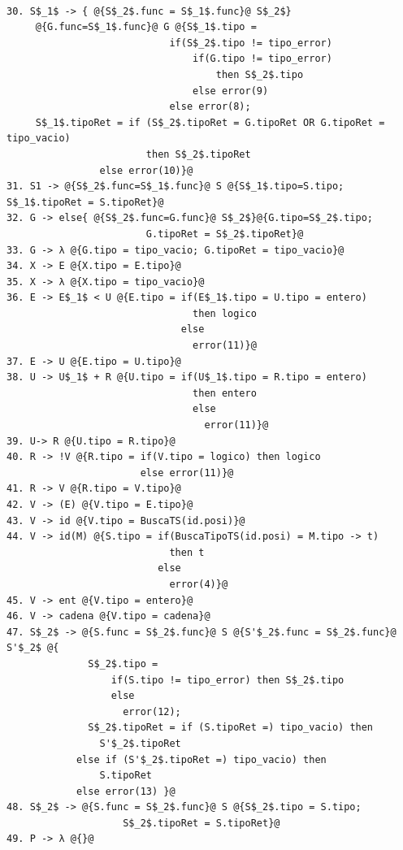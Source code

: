 \begin{lstlisting}[style=EdT]
                     
30. S$_1$ -> { @{S$_2$.func = S$_1$.func}@ S$_2$}
     @{G.func=S$_1$.func}@ G @{S$_1$.tipo =
                            if(S$_2$.tipo != tipo_error)
                                if(G.tipo != tipo_error)
                                    then S$_2$.tipo
                                else error(9)
                            else error(8);
     S$_1$.tipoRet = if (S$_2$.tipoRet = G.tipoRet OR G.tipoRet = tipo_vacio)
						then S$_2$.tipoRet
				else error(10)}@
31. S1 -> @{S$_2$.func=S$_1$.func}@ S @{S$_1$.tipo=S.tipo; S$_1$.tipoRet = S.tipoRet}@
32. G -> else{ @{S$_2$.func=G.func}@ S$_2$}@{G.tipo=S$_2$.tipo; 
						G.tipoRet = S$_2$.tipoRet}@
33. G -> λ @{G.tipo = tipo_vacio; G.tipoRet = tipo_vacio}@
34. X -> E @{X.tipo = E.tipo}@
35. X -> λ @{X.tipo = tipo_vacio}@
36. E -> E$_1$ < U @{E.tipo = if(E$_1$.tipo = U.tipo = entero)
                                then logico
                              else
                                error(11)}@
37. E -> U @{E.tipo = U.tipo}@
38. U -> U$_1$ + R @{U.tipo = if(U$_1$.tipo = R.tipo = entero)
                                then entero
                                else
                                  error(11)}@
39. U-> R @{U.tipo = R.tipo}@
40. R -> !V @{R.tipo = if(V.tipo = logico) then logico
                       else error(11)}@
41. R -> V @{R.tipo = V.tipo}@
42. V -> (E) @{V.tipo = E.tipo}@
43. V -> id @{V.tipo = BuscaTS(id.posi)}@
44. V -> id(M) @{S.tipo = if(BuscaTipoTS(id.posi) = M.tipo -> t)
                            then t
                          else
                            error(4)}@
45. V -> ent @{V.tipo = entero}@
46. V -> cadena @{V.tipo = cadena}@
47. S$_2$ -> @{S.func = S$_2$.func}@ S @{S'$_2$.func = S$_2$.func}@ S'$_2$ @{
              S$_2$.tipo =
                  if(S.tipo != tipo_error) then S$_2$.tipo
                  else
                    error(12);
              S$_2$.tipoRet = if (S.tipoRet =) tipo_vacio) then 
				S'$_2$.tipoRet
			else if (S'$_2$.tipoRet =) tipo_vacio) then
				S.tipoRet
			else error(13) }@
48. S$_2$ -> @{S.func = S$_2$.func}@ S @{S$_2$.tipo = S.tipo; 
					S$_2$.tipoRet = S.tipoRet}@
49. P -> λ @{}@
\end{lstlisting}
\newpage
